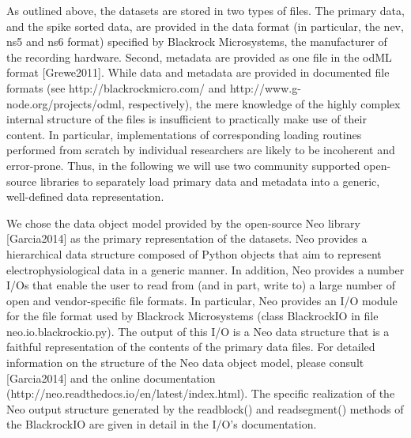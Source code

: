 As outlined above, the datasets are stored in two types of files. The primary data, and the spike sorted data, are provided in the data format (in particular, the nev, ns5 and ns6 format) specified by Blackrock Microsystems, the manufacturer of the recording hardware. Second, metadata are provided as one file in the odML format [Grewe2011]. While data and metadata are provided in documented file formats (see http://blackrockmicro.com/ and http://www.g-node.org/projects/odml, respectively), the mere knowledge of the highly complex internal structure of the files is insufficient to practically make use of their content. In particular, implementations of corresponding loading routines performed from scratch by individual researchers are likely to be incoherent and error-prone. Thus, in the following we will use two community supported open-source libraries to separately load primary data and metadata into a generic, well-defined data representation. 

We chose the data object model provided by the open-source Neo library [Garcia2014] as the primary representation of the datasets. Neo provides a hierarchical data structure composed of Python objects that aim to represent electrophysiological data in a generic manner. In addition, Neo provides a number I/Os that enable the user to read from (and in part, write to) a large number of open and vendor-specific file formats. In particular, Neo provides an I/O module for the file format used by Blackrock Microsystems (class BlackrockIO in file neo.io.blackrockio.py). The output of this I/O is a Neo data structure that is a faithful representation of the contents of the primary data files. For detailed information on the structure of the Neo data object model, please consult [Garcia2014] and the online documentation (http://neo.readthedocs.io/en/latest/index.html). The specific realization of the Neo output structure generated by the readblock() and readsegment() methods of the BlackrockIO are given in detail in the I/O's documentation. 

